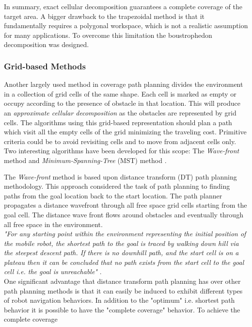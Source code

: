 In summary, exact cellular decomposition guarantees a complete coverage of the target area. A bigger drawback to the trapezoidal method is that it fundamentally requires a polygonal workspace, which is not a realistic assumption for many applications. To overcome this limitation the boustrophedon decomposition was designed.

\subsubsection{Grid-based Methods} %
\label{ssub:grid_based_methods}
Another largely used method in coverage path planning divides the environment in a collection of grid cells of the same shape. Each cell is marked as empty or occupy according to the presence of obstacle in that location. This will produce an \textit{approximate cellular decomposition} as the obstacles are represented by grid cells.
The algorithms using this grid-based representation should plan a path which visit all the empty cells of the grid minimizing the traveling cost. Primitive criteria could be to avoid revisiting cells and to move from adjacent cells only. Two interesting algorithms have been developed for this scope: The \textit{Wave-front} method \cite{Zelinsky93planningpaths} and \textit{Minimum-Spanning-Tree} (MST) method \cite{Gabriely2001}.\par
The \textit{Wave-front} method is based upon distance transform (DT) path planning methodology. This approach considered the task of path planning to finding paths from the goal location back to the start location. The path planner propagates a distance wavefront through all free space grid cells starting from the goal cell. The distance wave front flows around obstacles and eventually through all free space in the environment.\\
 \textit{"For any starting point within the environment representing the initial position of the mobile robot, the shortest path to the goal is traced by walking down hill via the steepest descent path. If there is no downhill path, and the start cell is on a plateau then it can be concluded that no path exists from the start cell to the goal cell i.e. the goal is unreachable"} \cite{Zelinsky93planningpaths}.\\
One significant advantage that distance transform path planning has over other path planning methods is that it can easily be induced to exhibit different types of robot navigation behaviors. In addition to the "optimum" i.e. shortest path behavior it is possible to have the "complete coverage" behavior. To achieve the complete coverage
